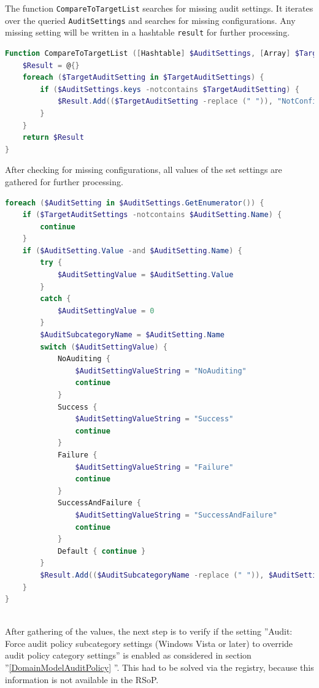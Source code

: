 The function \lstinline|CompareToTargetList| searches for missing audit settings. It iterates over the queried \lstinline|AuditSettings| and searches for missing configurations. Any missing setting will be written in a hashtable \lstinline|result| for further processing.
\begin{lstlisting}[caption=CompareToTargetList: Search missing configurations, language=PowerShell]
Function CompareToTargetList ([Hashtable] $AuditSettings, [Array] $TargetAuditSettings) {
    $Result = @{}    
    foreach ($TargetAuditSetting in $TargetAuditSettings) {
        if ($AuditSettings.keys -notcontains $TargetAuditSetting) {
            $Result.Add(($TargetAuditSetting -replace (" ")), "NotConfigured")
        }
    }
    return $Result
}
\end{lstlisting}

\clearpage
After checking for missing configurations, all values of the set settings are gathered for further processing.
\begin{lstlisting}[caption=GetAuditSettingValues: Get configured audit settings from RSoP, language=PowerShell]
foreach ($AuditSetting in $AuditSettings.GetEnumerator()) {
    if ($TargetAuditSettings -notcontains $AuditSetting.Name) {
        continue
    }
    if ($AuditSetting.Value -and $AuditSetting.Name) {
        try {
            $AuditSettingValue = $AuditSetting.Value
        }
        catch {
            $AuditSettingValue = 0
        }
        $AuditSubcategoryName = $AuditSetting.Name 
        switch ($AuditSettingValue) {
            NoAuditing {  
                $AuditSettingValueString = "NoAuditing"
                continue
            }
            Success {
                $AuditSettingValueString = "Success"
                continue
            } 
            Failure {
                $AuditSettingValueString = "Failure"
                continue
            }
            SuccessAndFailure {
                $AuditSettingValueString = "SuccessAndFailure"
                continue
            }
            Default { continue }
        }
        $Result.Add(($AuditSubcategoryName -replace (" ")), $AuditSettingValueString)
    }    
}
\end{lstlisting} \ \\
After gathering of the values, the next step is to verify if the setting ''Audit: Force audit policy subcategory settings (Windows Vista or later) to override audit policy category settings'' is enabled as considered in section ''\ref{DomainModelAuditPolicy} ''. This had to be solved via the registry, because this information is not available in the RSoP.

